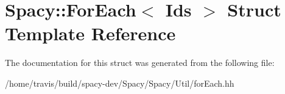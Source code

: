 \hypertarget{structSpacy_1_1ForEach}{\section{Spacy\-:\-:For\-Each$<$ Ids $>$ Struct Template Reference}
\label{structSpacy_1_1ForEach}
}


The documentation for this struct was generated from the following file\-:\begin{DoxyCompactItemize}
\item 
/home/travis/build/spacy-\/dev/\-Spacy/\-Spacy/\-Util/for\-Each.\-hh\end{DoxyCompactItemize}
